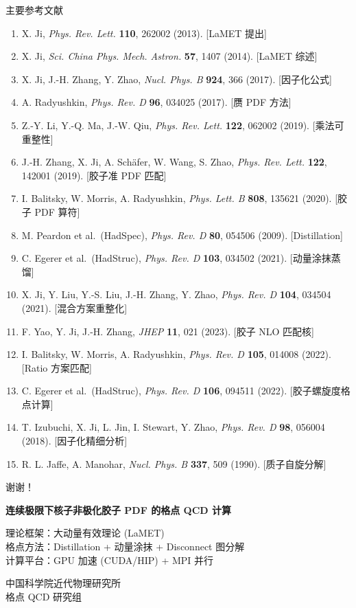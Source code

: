 \documentclass[10pt,aspectratio=169]{beamer}
\begin{document}
\begin{frame}{主要参考文献}
{\footnotesize
\begin{enumerate}
  \item X. Ji, \textit{Phys. Rev. Lett.} \textbf{110}, 262002 (2013). [LaMET 提出]
  \item X. Ji, \textit{Sci. China Phys. Mech. Astron.} \textbf{57}, 1407 (2014). [LaMET 综述]
  \item X. Ji, J.-H. Zhang, Y. Zhao, \textit{Nucl. Phys. B} \textbf{924}, 366 (2017). [因子化公式]
  \item A. Radyushkin, \textit{Phys. Rev. D} \textbf{96}, 034025 (2017). [赝 PDF 方法]
  \item Z.-Y. Li, Y.-Q. Ma, J.-W. Qiu, \textit{Phys. Rev. Lett.} \textbf{122}, 062002 (2019). [乘法可重整性]
  \item J.-H. Zhang, X. Ji, A. Sch\"afer, W. Wang, S. Zhao, \textit{Phys. Rev. Lett.} \textbf{122}, 142001 (2019). [胶子准 PDF 匹配]
  \item I. Balitsky, W. Morris, A. Radyushkin, \textit{Phys. Lett. B} \textbf{808}, 135621 (2020). [胶子 PDF 算符]
  \item M. Peardon et al.\ (HadSpec), \textit{Phys. Rev. D} \textbf{80}, 054506 (2009). [Distillation]
  \item C. Egerer et al.\ (HadStruc), \textit{Phys. Rev. D} \textbf{103}, 034502 (2021). [动量涂抹蒸馏]
  \item X. Ji, Y. Liu, Y.-S. Liu, J.-H. Zhang, Y. Zhao, \textit{Phys. Rev. D} \textbf{104}, 034504 (2021). [混合方案重整化]
  \item F. Yao, Y. Ji, J.-H. Zhang, \textit{JHEP} \textbf{11}, 021 (2023). [胶子 NLO 匹配核]
  \item I. Balitsky, W. Morris, A. Radyushkin, \textit{Phys. Rev. D} \textbf{105}, 014008 (2022). [Ratio 方案匹配]
  \item C. Egerer et al.\ (HadStruc), \textit{Phys. Rev. D} \textbf{106}, 094511 (2022). [胶子螺旋度格点计算]
  \item T. Izubuchi, X. Ji, L. Jin, I. Stewart, Y. Zhao, \textit{Phys. Rev. D} \textbf{98}, 056004 (2018). [因子化精细分析]
  \item R. L. Jaffe, A. Manohar, \textit{Nucl. Phys. B} \textbf{337}, 509 (1990). [质子自旋分解]
\end{enumerate}
}
\end{frame}

\begin{frame}
\centering
\Huge 谢谢！
\normalsize

\vspace{1cm}
\textbf{连续极限下核子非极化胶子 PDF 的格点 QCD 计算}

\vspace{0.5cm}
{\small
理论框架：大动量有效理论 (LaMET)\\
格点方法：Distillation + 动量涂抹 + Disconnect 图分解\\
计算平台：GPU 加速 (CUDA/HIP) + MPI 并行

\vspace{0.5cm}
中国科学院近代物理研究所\\
格点 QCD 研究组
}
\end{frame}
\end{document}
